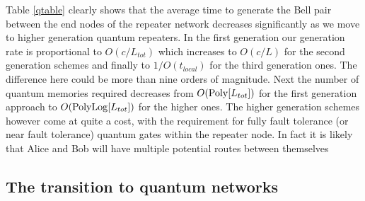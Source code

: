 \documentclass[twocolumn, aps, rmp, amsmath, amssymb, nofootinbib, superscriptaddress, longbibliography, floatfix, table-of-contents, eqsecnum]{revtex4-1}
\begin{document}
Table  \ref{qtable} clearly shows that the average time to generate the Bell pair between the end nodes of the repeater network decreases significantly as we move to higher generation quantum repeaters. In the first generation our generation rate is proportional to $O(c/L_{tot})$ which increases to $O(c/L)$ for the second generation schemes and finally to $1/O(t_{local})$ for the third generation ones. The difference here could be more than nine orders of magnitude. Next the number of quantum memories required decreases from $O({\rm Poly}[L_{tot}])$ for the first generation approach to $O({\rm PolyLog}[L_{tot}])$ for the higher ones. The higher generation schemes however come at quite a cost, with the requirement for fully fault tolerance (or near fault tolerance) quantum gates within the repeater node. In fact it is likely that Alice and Bob will have multiple potential routes between themselves

\subsection{The transition to quantum networks}
\end{document}
